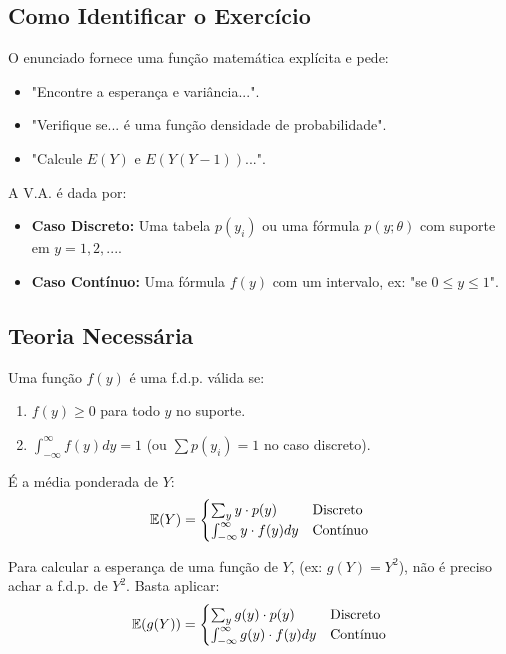 \subsection{Como Identificar o Exercício}
O enunciado fornece uma função matemática explícita e pede:
\begin{itemize}
    \item "Encontre a esperança e variância...".
    \item "Verifique se... é uma função densidade de probabilidade".
    \item "Calcule $E(Y)$ e $E(Y(Y-1))$...".
\end{itemize}
A V.A. é dada por:
\begin{itemize}
    \item \textbf{Caso Discreto:} Uma tabela $p(y_i)$ ou uma fórmula $p(y; \theta)$ com suporte em $y=1, 2, ...$.
    \item \textbf{Caso Contínuo:} Uma fórmula $f(y)$ com um intervalo, ex: "se $0 \le y \le 1$".
\end{itemize}

\subsection{Teoria Necessária}

\begin{definicao}[f.d.p. Válida]
Uma função $f(y)$ é uma f.d.p. válida se:
\begin{enumerate}
    \item $f(y) \ge 0$ para todo $y$ no suporte.
    \item $\int_{-\infty}^{\infty} f(y) dy = 1$ (ou $\sum p(y_i) = 1$ no caso discreto).
\end{enumerate}
\end{definicao}

\begin{definicao}
É a média ponderada de $Y$:
$$ \mathbb{E}(Y) = \begin{cases} 
      \sum_{y} y \cdot p(y) & \text{Discreto} \\
      \int_{-\infty}^{\infty} y \cdot f(y) dy & \text{Contínuo}
   \end{cases} $$
\end{definicao}

\begin{propriedade}
Para calcular a esperança de uma função de $Y$, (ex: $g(Y) = Y^2$), não é preciso achar a f.d.p. de $Y^2$. Basta aplicar:
$$ \mathbb{E}(g(Y)) = \begin{cases} 
      \sum_{y} g(y) \cdot p(y) & \text{Discreto} \\
      \int_{-\infty}^{\infty} g(y) \cdot f(y) dy & \text{Contínuo}
   \end{cases} $$
\end{propriedade}

